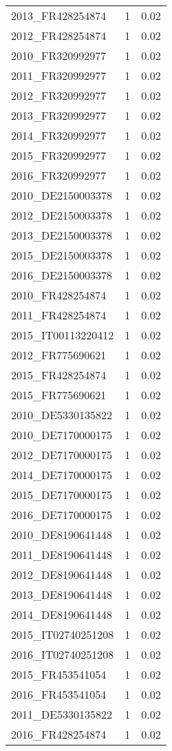 \begin{table*}[htbp]
\begin{tabular}{lrr}
2013_FR428254874 & 1 & 0.02 \\
2012_FR428254874 & 1 & 0.02 \\
2010_FR320992977 & 1 & 0.02 \\
2011_FR320992977 & 1 & 0.02 \\
2012_FR320992977 & 1 & 0.02 \\
2013_FR320992977 & 1 & 0.02 \\
2014_FR320992977 & 1 & 0.02 \\
2015_FR320992977 & 1 & 0.02 \\
2016_FR320992977 & 1 & 0.02 \\
2010_DE2150003378 & 1 & 0.02 \\
2012_DE2150003378 & 1 & 0.02 \\
2013_DE2150003378 & 1 & 0.02 \\
2015_DE2150003378 & 1 & 0.02 \\
2016_DE2150003378 & 1 & 0.02 \\
2010_FR428254874 & 1 & 0.02 \\
2011_FR428254874 & 1 & 0.02 \\
2015_IT00113220412 & 1 & 0.02 \\
2012_FR775690621 & 1 & 0.02 \\
2015_FR428254874 & 1 & 0.02 \\
2015_FR775690621 & 1 & 0.02 \\
2010_DE5330135822 & 1 & 0.02 \\
2010_DE7170000175 & 1 & 0.02 \\
2012_DE7170000175 & 1 & 0.02 \\
2014_DE7170000175 & 1 & 0.02 \\
2015_DE7170000175 & 1 & 0.02 \\
2016_DE7170000175 & 1 & 0.02 \\
2010_DE8190641448 & 1 & 0.02 \\
2011_DE8190641448 & 1 & 0.02 \\
2012_DE8190641448 & 1 & 0.02 \\
2013_DE8190641448 & 1 & 0.02 \\
2014_DE8190641448 & 1 & 0.02 \\
2015_IT02740251208 & 1 & 0.02 \\
2016_IT02740251208 & 1 & 0.02 \\
2015_FR453541054 & 1 & 0.02 \\
2016_FR453541054 & 1 & 0.02 \\
2011_DE5330135822 & 1 & 0.02 \\
2016_FR428254874 & 1 & 0.02 \\

\end{tabular}
\end{table*}
